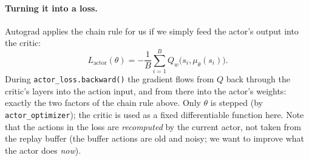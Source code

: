 \documentclass[11pt,a4paper]{article}
\newcommand{\code}[1]{\texttt{#1}}
\begin{document}
\paragraph{Turning it into a loss.} Autograd applies the chain rule for us if we simply feed the actor's output into the critic:
\begin{equation}
  L_{\mathrm{actor}}(\theta) = -\frac1B\sum_{i=1}^B Q_w\big(s_i,\mu_\theta(s_i)\big).
\end{equation}
During \code{actor\_loss.backward()} the gradient flows from $Q$ back through the critic's layers into the action input, and from there into the actor's weights: exactly the two factors of the chain rule above.
Only $\theta$ is stepped (by \code{actor\_optimizer}); the critic is used as a fixed differentiable function here. Note that the actions in the loss are \emph{recomputed} by the current actor, not taken from the replay buffer (the buffer actions are old and noisy; we want to improve what the actor does \emph{now}).
\end{document}
